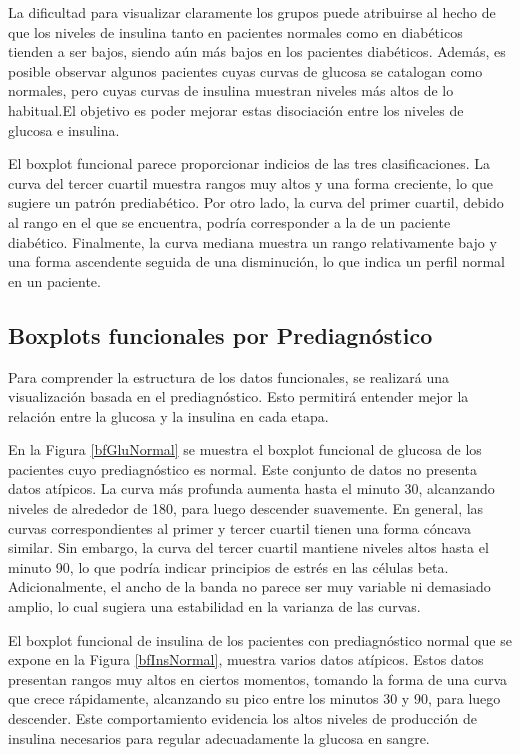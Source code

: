 La dificultad para visualizar claramente los grupos puede atribuirse al hecho de que los niveles de insulina tanto en pacientes normales como en diabéticos tienden a ser bajos, siendo aún más bajos en los pacientes diabéticos. Además, es posible observar algunos pacientes cuyas curvas de glucosa se catalogan como normales, pero cuyas curvas de insulina muestran niveles más altos de lo habitual.El objetivo es poder mejorar estas disociación entre los niveles de glucosa e insulina.


El boxplot funcional parece proporcionar indicios de las tres clasificaciones. La curva del tercer cuartil muestra rangos muy altos y una forma creciente, lo que sugiere un patrón prediabético. Por otro lado, la curva del primer cuartil, debido al rango en el que se encuentra, podría corresponder a la de un paciente diabético. Finalmente, la curva mediana muestra un rango relativamente bajo y una forma ascendente seguida de una disminución, lo que indica un perfil normal en un paciente.

\subsection{Boxplots funcionales por Prediagnóstico}

Para comprender la estructura de los datos funcionales, se realizará una visualización basada en el prediagnóstico. Esto permitirá entender mejor la relación entre la glucosa y la insulina en cada etapa.

En la Figura \ref{bfGluNormal} se muestra el boxplot funcional de glucosa de los pacientes cuyo prediagnóstico es normal. Este conjunto de datos no presenta datos atípicos. La curva más profunda aumenta hasta el minuto 30, alcanzando niveles de alrededor de 180, para luego descender suavemente. En general, las curvas correspondientes al primer y tercer cuartil tienen una forma cóncava similar. Sin embargo, la curva del tercer cuartil mantiene niveles altos hasta el minuto 90, lo que podría indicar principios de estrés en las células beta. Adicionalmente, el ancho de la banda no parece ser muy variable ni demasiado amplio, lo cual sugiera una estabilidad en la varianza de las curvas.

El boxplot funcional de insulina de los pacientes con prediagnóstico normal que se expone en la Figura \ref{bfInsNormal}, muestra varios datos atípicos. Estos datos presentan rangos muy altos en ciertos momentos, tomando la forma de una curva que crece rápidamente, alcanzando su pico entre los minutos 30 y 90, para luego descender. Este comportamiento evidencia los altos niveles de producción de insulina necesarios para regular adecuadamente la glucosa en sangre.

